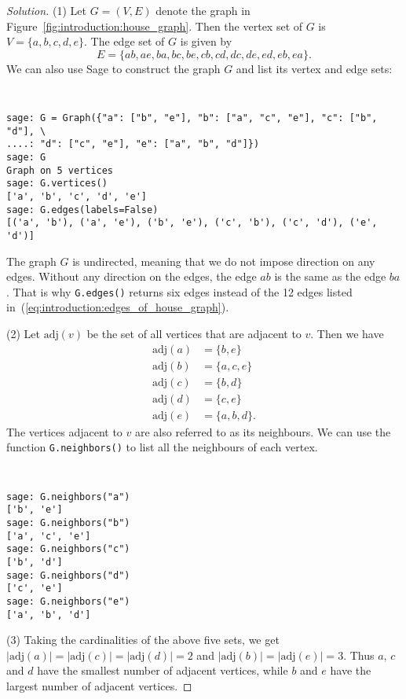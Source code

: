 \begin{proof}[Solution]
(1) Let $G = (V, E)$ denote the graph in
Figure~\ref{fig:introduction:house_graph}. Then the vertex set of $G$
is $V = \{ a, b, c, d, e \}$. The edge set of $G$ is given by
\begin{equation}
\label{eq:introduction:edges_of_house_graph}
E
=
\{ ab, ae, ba, bc, be, cb, cd, dc, de, ed, eb, ea \}.
\end{equation}
We can also use Sage to construct the graph $G$ and list its vertex
and edge sets:
%
\begin{center}
\fontsize{9pt}{9pt}
\selectfont
\tt
\begin{lstlisting}
sage: G = Graph({"a": ["b", "e"], "b": ["a", "c", "e"], "c": ["b", "d"], \
....: "d": ["c", "e"], "e": ["a", "b", "d"]})
sage: G
Graph on 5 vertices
sage: G.vertices()
['a', 'b', 'c', 'd', 'e']
sage: G.edges(labels=False)
[('a', 'b'), ('a', 'e'), ('b', 'e'), ('c', 'b'), ('c', 'd'), ('e', 'd')]
\end{lstlisting}
\end{center}
%
The graph $G$ is undirected, meaning that we do not impose direction
on any edges. Without any direction on the edges, the edge $ab$ is the
same as the edge $ba$. That is why \texttt{G.edges()} returns six
edges instead of the 12 edges listed
in~(\ref{eq:introduction:edges_of_house_graph}).

(2) Let $\text{adj}(v)$ be the set of all vertices that are adjacent
to $v$. Then we have
%
\begin{align*}
\text{adj}(a) &= \{ b, e \} \\
\text{adj}(b) &= \{ a, c, e \} \\
\text{adj}(c) &= \{ b, d \} \\
\text{adj}(d) &= \{ c, e \} \\
\text{adj}(e) &= \{ a, b, d \}.
\end{align*}
%
The vertices adjacent to $v$ are also referred to as its
neighbours. We can use the function \texttt{G.neighbors()} to list all
the neighbours of each vertex.
%
\begin{center}
\fontsize{9pt}{9pt}
\selectfont
\tt
\begin{lstlisting}
sage: G.neighbors("a")
['b', 'e']
sage: G.neighbors("b")
['a', 'c', 'e']
sage: G.neighbors("c")
['b', 'd']
sage: G.neighbors("d")
['c', 'e']
sage: G.neighbors("e")
['a', 'b', 'd']
\end{lstlisting}
\end{center}

(3) Taking the cardinalities of the above five sets, we get
$|\text{adj}(a)| = |\text{adj}(c)| = |\text{adj}(d)| = 2$ and
$|\text{adj}(b)| = |\text{adj}(e)| = 3$. Thus $a$, $c$ and $d$ have
the smallest number of adjacent vertices, while $b$ and $e$ have the
largest number of adjacent vertices.


\end{proof}
